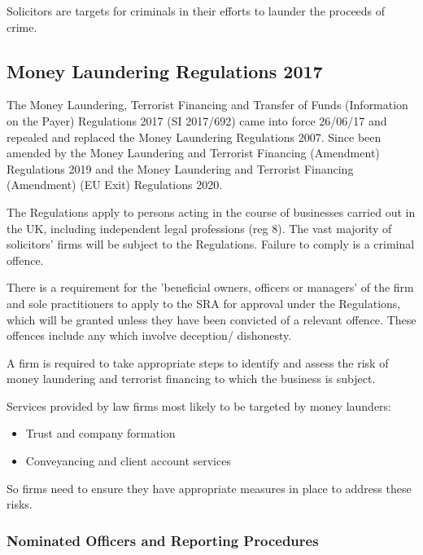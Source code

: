 \documentclass[
]{article}
\providecommand{\tightlist}{%
  \setlength{\itemsep}{0pt}\setlength{\parskip}{0pt}}
\begin{document}
Solicitors are targets for criminals in their efforts to launder the
proceeds of crime.

\hypertarget{money-laundering-regulations-2017}{%
\subsection{Money Laundering Regulations
2017}\label{money-laundering-regulations-2017}}

The Money Laundering, Terrorist Financing and Transfer of Funds
(Information on the Payer) Regulations 2017 (SI 2017/692) came into
force 26/06/17 and repealed and replaced the Money Laundering
Regulations 2007. Since been amended by the Money Laundering and
Terrorist Financing (Amendment) Regulations 2019 and the Money
Laundering and Terrorist Financing (Amendment) (EU Exit) Regulations
2020.

The Regulations apply to persons acting in the course of businesses
carried out in the UK, including independent legal professions (reg 8).
The vast majority of solicitors' firms will be subject to the
Regulations. Failure to comply is a criminal offence.

There is a requirement for the 'beneficial owners, officers or managers'
of the firm and sole practitioners to apply to the SRA for approval
under the Regulations, which will be granted unless they have been
convicted of a relevant offence. These offences include any which
involve deception/ dishonesty.

A firm is required to take appropriate steps to identify and assess the
risk of money laundering and terrorist financing to which the business
is subject.

Services provided by law firms most likely to be targeted by money
launders:

\begin{itemize}
\tightlist
\item
  Trust and company formation
\item
  Conveyancing and client account services
\end{itemize}

So firms need to ensure they have appropriate measures in place to
address these risks.

\hypertarget{nominated-officers-and-reporting-procedures}{%
\subsubsection{Nominated Officers and Reporting
Procedures}\label{nominated-officers-and-reporting-procedures}}
\end{document}
